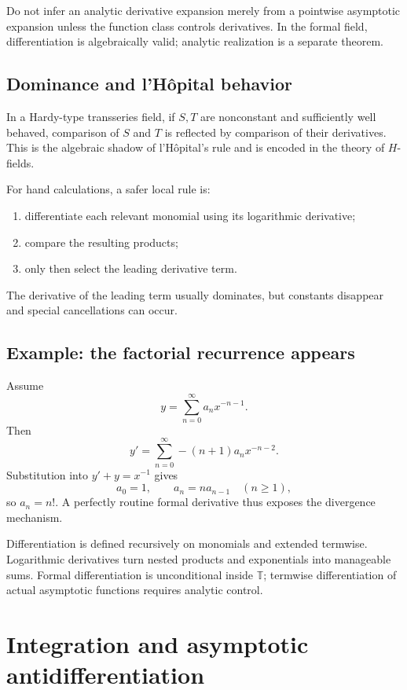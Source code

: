 \documentclass[11pt,oneside]{book}
\theoremstyle{definition}
\theoremstyle{remark}
\newcommand{\T}{\mathbb{T}}
\begin{document}
\begin{warningbox}
Do not infer an analytic derivative expansion merely from a pointwise
asymptotic expansion unless the function class controls derivatives. In the
formal field, differentiation is algebraically valid; analytic realization is a
separate theorem.
\end{warningbox}

\section{Dominance and l'H\^opital behavior}

In a Hardy-type transseries field, if $S,T$ are nonconstant and sufficiently
well behaved, comparison of $S$ and $T$ is reflected by comparison of their
derivatives. This is the algebraic shadow of l'H\^opital's rule and is encoded in
the theory of $H$-fields.

For hand calculations, a safer local rule is:
\begin{enumerate}
\item differentiate each relevant monomial using its logarithmic derivative;
\item compare the resulting products;
\item only then select the leading derivative term.
\end{enumerate}
The derivative of the leading term usually dominates, but constants disappear
and special cancellations can occur.

\section{Example: the factorial recurrence appears}

Assume
\[
  y=\sum_{n=0}^{\infty}a_nx^{-n-1}.
\]
Then
\[
  y'=\sum_{n=0}^{\infty}-(n+1)a_nx^{-n-2}.
\]
Substitution into $y'+y=x^{-1}$ gives
\[
  a_0=1,
  \qquad
  a_n=na_{n-1}\quad(n\ge1),
\]
so $a_n=n!$. A perfectly routine formal derivative thus exposes the divergence
mechanism.

\begin{summarybox}
Differentiation is defined recursively on monomials and extended termwise.
Logarithmic derivatives turn nested products and exponentials into manageable
sums. Formal differentiation is unconditional inside $\T$; termwise
differentiation of actual asymptotic functions requires analytic control.
\end{summarybox}

\chapter{Integration and asymptotic antidifferentiation}
\label{ch:integration}
\end{document}

